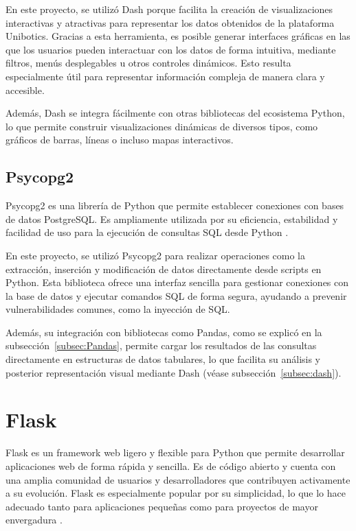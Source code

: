 \documentclass[a4paper, 12pt]{book}
\begin{document}
En este proyecto, se utilizó Dash porque facilita la creación de visualizaciones interactivas y atractivas para representar los datos obtenidos de la plataforma Unibotics. Gracias a esta herramienta, es posible generar interfaces gráficas en las que los usuarios pueden interactuar con los datos de forma intuitiva, mediante filtros, menús desplegables u otros controles dinámicos. Esto resulta especialmente útil para representar información compleja de manera clara y accesible.

Además, Dash se integra fácilmente con otras bibliotecas del ecosistema Python, lo que permite construir visualizaciones dinámicas de diversos tipos, como gráficos de barras, líneas o incluso mapas interactivos.

\subsection{Psycopg2}
\label{subsec:psycopg2}

Psycopg2 es una librería de Python que permite establecer conexiones con bases de datos PostgreSQL. Es ampliamente utilizada por su eficiencia, estabilidad y facilidad de uso para la ejecución de consultas SQL desde Python \cite{psycopgDocumentation}.

En este proyecto, se utilizó Psycopg2 para realizar operaciones como la extracción, inserción y modificación de datos directamente desde scripts en Python. Esta biblioteca ofrece una interfaz sencilla para gestionar conexiones con la base de datos y ejecutar comandos SQL de forma segura, ayudando a prevenir vulnerabilidades comunes, como la inyección de SQL.

Además, su integración con bibliotecas como Pandas, como se explicó en la subsección~\ref{subsec:Pandas}, permite cargar los resultados de las consultas directamente en estructuras de datos tabulares, lo que facilita su análisis y posterior representación visual mediante Dash (véase subsección~\ref{subsec:dash}).

\section{Flask}
\label{sec:Flask}

Flask es un framework web ligero y flexible para Python que permite desarrollar aplicaciones web de forma rápida y sencilla. Es de código abierto y cuenta con una amplia comunidad de usuarios y desarrolladores que contribuyen activamente a su evolución. Flask es especialmente popular por su simplicidad, lo que lo hace adecuado tanto para aplicaciones pequeñas como para proyectos de mayor envergadura \cite{grinbergflask}.
\end{document}
